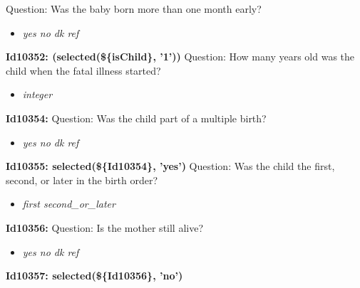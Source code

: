 \documentclass{article}%
\begin{document}
Question: Was the baby born more than one month early?\newline%
%
\begin{itemize}%
\item%
\textit{yes\newline%
 no\newline%
 dk\newline%
 ref\newline%
}%
\end{itemize}%
\textbf{Id10352: (selected(\$\{isChild\}, '1'))\newline%
}%
Question: How many years old was the child when the fatal illness started?\newline%
%
\begin{itemize}%
\item%
\textit{integer\newline%
}%
\end{itemize}%
\textbf{Id10354: \newline%
}%
Question: Was the child part of a multiple  birth?\newline%
%
\begin{itemize}%
\item%
\textit{yes\newline%
 no\newline%
 dk\newline%
 ref\newline%
}%
\end{itemize}%
\textbf{Id10355: selected(\$\{Id10354\}, 'yes')\newline%
}%
Question: Was the child the first, second, or later in the birth order?\newline%
%
\begin{itemize}%
\item%
\textit{first\newline%
 second\_or\_later\newline%
}%
\end{itemize}%
\textbf{Id10356: \newline%
}%
Question: Is the mother still alive?\newline%
%
\begin{itemize}%
\item%
\textit{yes\newline%
 no\newline%
 dk\newline%
 ref\newline%
}%
\end{itemize}%
\textbf{Id10357: selected(\$\{Id10356\}, 'no')\newline%
}%
\end{document}
